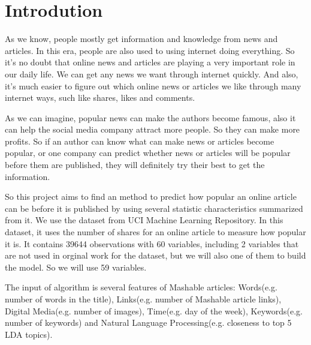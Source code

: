 \documentclass[11pt]{article}
\begin{document}
\section{Introdution}
As we know, people mostly get information and knowledge from news and articles. In this era, people are also used to using internet doing everything. So it’s no doubt that online news and articles are playing a very important role in our daily life. We can get any news we want through internet quickly. And also, it’s much easier to figure out which online news or articles we like through many internet ways, such like shares, likes and comments. 

As we can imagine, popular news can make the authors become famous, also it can help the social media company attract more people. So they can make more profits. So if an author can know what can make news or articles become popular, or one company can predict whether news or articles will be popular before them are published, they will definitely try their best to get the information. 

So this project aims to find an method to predict how popular an online article can be before it is published by using several statistic characteristics summarized from it. We use the dataset from UCI Machine Learning Repository. In this dataset, it uses the number of shares for an online article to measure how popular it is. It contains 39644 observations with 60 variables, including 2 variables that are not used in orginal work for the dataset, but we will also one of them to build the model. So we will use 59 variables.

The input of algorithm is several features of Mashable articles: Words(e.g. number of words in the title), Links(e.g. number of Mashable article links), Digital Media(e.g. number of images), Time(e.g. day of the week), Keywords(e.g. number of keywords) and Natural Language Processing(e.g. closeness to top 5 LDA topics).
\end{document}
